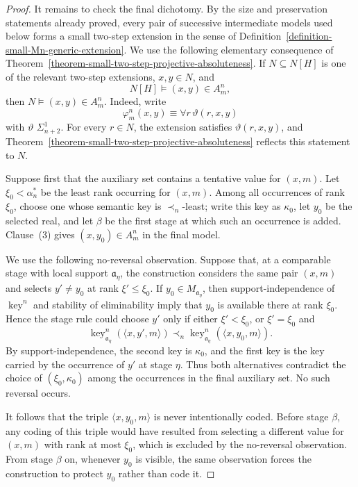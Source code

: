 \documentclass[a4paper,11pt]{article}
\newcommand{\key}{\operatorname{key}}
\begin{document}
\begin{proof}
It remains to check the final dichotomy.  By the size and preservation
statements already proved, every pair of successive intermediate models used
below forms a small two-step extension in the sense of
Definition~\ref{definition-small-Mn-generic-extension}.  We use the following
elementary consequence of
Theorem~\ref{theorem-small-two-step-projective-absoluteness}.  If
$N\subseteq N[H]$ is one of the relevant two-step extensions,
$x,y\in N$, and
\[
   N[H]\models(x,y)\in A^n_m,
\]
then $N\models(x,y)\in A^n_m$.  Indeed, write
\[
   \varphi^n_m(x,y)\equiv
   \forall r\,\vartheta(r,x,y)
\]
with $\vartheta$ $\Sigma^1_{n+2}$.  For every $r\in N$, the extension
satisfies $\vartheta(r,x,y)$, and
Theorem~\ref{theorem-small-two-step-projective-absoluteness} reflects this
statement to $N$.

Suppose first that the auxiliary set contains a tentative value for $(x,m)$.
Let $\xi_0<\alpha_n^\ast$ be the least rank occurring for $(x,m)$.  Among all
occurrences of rank $\xi_0$, choose one whose semantic key is $\prec_n$-least;
write this key as $\kappa_0$, let $y_0$ be the selected real, and let $\beta$
be the first stage at which such an occurrence is added.  Clause~(3) gives
$(x,y_0)\in A^n_m$ in the final model.

We use the following no-reversal observation.  Suppose that, at a comparable
stage with local support $\mathfrak a_\eta$, the construction considers the
same pair $(x,m)$ and selects $y'\neq y_0$ at rank $\xi'\leq\xi_0$.  If
$y_0\in M_{\mathfrak a_\eta}$, then support-independence of $\key^n$ and
stability of eliminability imply that $y_0$ is available there at rank
$\xi_0$.  Hence the stage rule could choose $y'$ only if either
$\xi'<\xi_0$, or $\xi'=\xi_0$ and
\[
   \key^n_{\mathfrak a_\eta}(\langle x,y',m\rangle)
   \prec_n
   \key^n_{\mathfrak a_\eta}(\langle x,y_0,m\rangle).
\]
By support-independence, the second key is $\kappa_0$, and the first key is
the key carried by the occurrence of $y'$ at stage $\eta$.  Thus both
alternatives contradict the choice of $(\xi_0,\kappa_0)$ among the occurrences
in the final auxiliary set.  No such reversal occurs.

It follows that the triple $\langle x,y_0,m\rangle$ is never intentionally
coded.  Before stage $\beta$, any coding of this triple would have resulted
from selecting a different value for $(x,m)$ with rank at most $\xi_0$, which
is excluded by the no-reversal observation.  From stage $\beta$ on, whenever
$y_0$ is visible, the same observation forces the construction to protect
$y_0$ rather than code it.


\end{proof}
\end{document}
